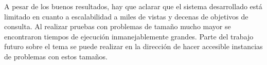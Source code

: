 \documentclass{article}
\begin{document}
A pesar de los buenos resultados, hay que aclarar que el sistema desarrollado
está limitado en cuanto a escalabilidad a miles de vistas y decenas de objetivos
de consulta. Al realizar pruebas con problemas de tamaño mucho mayor se
encontraron tiempos de ejecución inmanejablemente grandes. Parte del trabajo
futuro sobre el tema se puede realizar en la dirección de hacer accesible
instancias de problemas con estos tamaños.



\end{document}
